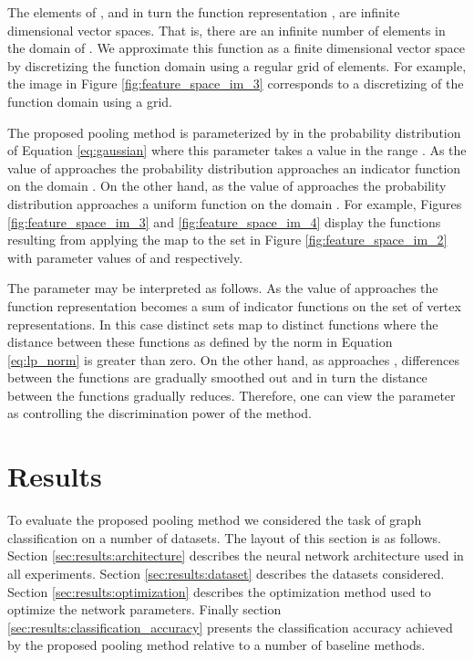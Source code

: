 \documentclass[runningheads]{llncs}
\begin{document}
The elements of , and in turn the function representation , are infinite dimensional vector spaces. That is, there are an infinite number of elements in the domain  of . We approximate this function as a finite dimensional vector space by discretizing the function domain using a regular grid of elements. For example, the image in Figure \ref{fig:feature_space_im_3} corresponds to a discretizing of the function domain using a  grid.

The proposed pooling method is parameterized by  in the probability distribution of Equation \ref{eq:gaussian} where this parameter takes a value in the range . As the value of  approaches  the probability distribution approaches an indicator function on the domain . On the other hand, as the value of  approaches  the probability distribution approaches a uniform function on the domain . For example, Figures \ref{fig:feature_space_im_3} and \ref{fig:feature_space_im_4} display the functions  resulting from applying the map  to the set  in Figure \ref{fig:feature_space_im_2} with  parameter values of  and  respectively.

The parameter  may be interpreted as follows. As the value of  approaches  the function representation  becomes a sum of indicator functions on the set  of vertex representations. In this case distinct sets  map to distinct functions where the distance between these functions as defined by the norm in Equation \ref{eq:lp_norm} is greater than zero. On the other hand, as  approaches , differences between the functions are gradually smoothed out and in turn the distance between the functions gradually reduces. Therefore, one can view the parameter  as controlling the discrimination power of the method. 


\section{Results}
\label{sec:results}
To evaluate the proposed pooling method we considered the task of graph classification on a number of datasets. The layout of this section is as follows. Section \ref{sec:results:architecture} describes the neural network architecture used in all experiments. Section \ref{sec:results:dataset} describes the datasets considered. Section \ref{sec:results:optimization} describes the optimization method used to optimize the network parameters. Finally section \ref{sec:results:classification_accuracy} presents the classification accuracy achieved by the proposed pooling method relative to a number of baseline methods.
\end{document}
